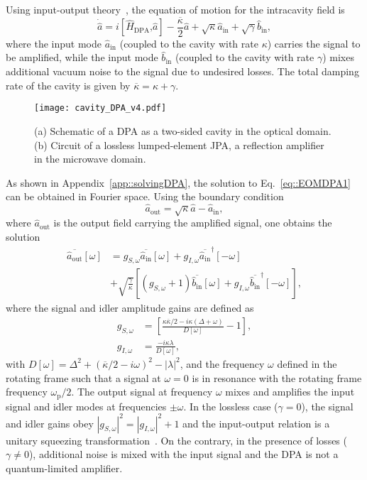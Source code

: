 \documentclass[pra,twocolumn,superscriptaddress]{revtex4-1}
\newcommand{\ah}[0]{\hat{a}}
\newcommand{\wpump}[0]{\omega_{\mathrm{p}}}
\newcommand{\kappaTot}[0]{\overline{\kappa}}
\newcommand{\ain}[0]{\hat{a}_{\mathrm{in}}}
\newcommand{\bin}[0]{\hat{b}_{\mathrm{in}}}
\newcommand{\aout}[0]{\hat{a}_{\mathrm{out}}}
\newcommand{\parS}[1]{\left[#1\right]}
\newcommand{\parO}[1]{\left(#1\right)}
\newcommand{\abs}[1]{\left|#1\right|}
\newcommand{\comm}[2]{\left[#1 \textrm{,} #2 \right]}
\begin{document}
Using input-output theory~\cite{Gardiner:2004fk,Walls:2008fk}, the equation of motion for the intracavity field is
% 
\begin{equation} \label{eq::EOMDPA1}
	\dot \ah = i \comm{\hat{H}_{\mathrm{DPA}}}{\ah} - \frac{\kappaTot }{2}\ah +\sqrt{\kappa} \ain + \sqrt{\gamma} \bin,
\end{equation}
% 
where the input mode $\ain$ (coupled to the cavity with rate $\kappa$) carries the signal to be amplified, while the input mode $\bin$ (coupled to the cavity with rate $\gamma$) mixes additional vacuum noise to the signal due to undesired losses. The total damping rate of the cavity is given by $\kappaTot = \kappa + \gamma$.
\begin{figure}[tb]
	\texttt{[image: cavity\_DPA\_v4.pdf]}
	\caption{(a) Schematic of a DPA as a two-sided cavity in the optical domain. 
	(b) Circuit of a lossless lumped-element JPA, a reflection amplifier in the microwave domain.
	}
	\label{fig:circuit}
\end{figure}


As shown in Appendix~\ref{app::solvingDPA}, the solution to Eq.~\eqref{eq::EOMDPA1} can be obtained in Fourier space. Using the boundary condition~\cite{Gardiner:2004fk,Walls:2008fk}
\begin{equation}
	\aout = \sqrt{\kappa} \ah - \ain,
	\label{eq:boundary}
\end{equation}
where $\aout$ is the output field carrying the amplified signal, 
one obtains the solution 
\begin{equation}
\begin{split}
	\overline{\aout} [\omega] &= 
	g_{S,\omega} \overline{\ain}[\omega] 
	+ 
	g_{I,\omega}\overline{\ain}^\dagger[-\omega]
	\\ &
	+
	\sqrt{\frac{\gamma}{\kappa}}
	\parS{
		\parO{g_{S,\omega}+1} \overline{\bin}[\omega] 
		+ 
		g_{I,\omega}\overline{\bin}^\dagger[-\omega]
	},
	\end{split}
	\label{eq::DPA_inputOutput}
\end{equation}
where the signal and idler amplitude gains are defined as
\begin{align}
	g_{S,\omega} &= \parS{ \frac{\kappa \kappaTot /2-i\kappa \parO{ \Delta+ \omega } }{D[\omega]} -1}, 
	\label{eq:gainSignal}
		\\ 
		g_{I,\omega} &= \frac{- i \kappa \lambda}{D[\omega]}, \label{eq:gainIdler}
\end{align}
with $D[\omega]= \Delta^2 + \parO{\kappaTot/2 - i \omega}^2- \abs{\lambda}^2$, and the frequency $\omega$ defined in the rotating frame such that a signal at $\omega=0$ is in resonance with the rotating frame frequency $\wpump/2$.
% 
The output signal at frequency $\omega$ mixes and amplifies the input signal and idler modes at frequencies $\pm \omega$. 
In the lossless case ($\gamma=0$), the signal and idler gains obey $\abs{g_{S,\omega}}^2 = \abs{g_{I,\omega}}^2 +1$ and the input-output relation is a unitary squeezing transformation~\cite{caves:1982a}. On the contrary, in the presence of losses ($\gamma \neq 0$), additional noise is mixed with the input signal and the DPA is not a quantum-limited amplifier.
\end{document}
